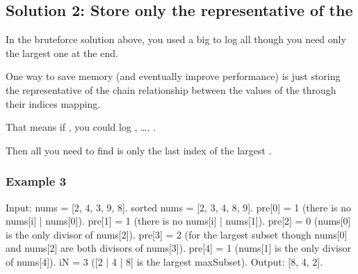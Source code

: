 \documentclass[letterpaper,12pt,english]{book}
\begin{document}
\subsection{Solution 2: Store only the representative of the }
\label{\detokenize{Dynamic_Programming/05_DP_368_Largest_Divisible_Subset:solution-2-store-only-the-representative-of-the-maxsubset}}
\sphinxAtStartPar
In the brute\sphinxhyphen{}force solution above, you used a big  to log all  though you need only the largest one at the end.

\sphinxAtStartPar
One way to save memory (and eventually improve performance) is just storing the representative of the chain relationship between the values  of the  through their indices mapping.

\sphinxAtStartPar
That means if \sphinxcode{\sphinxupquote{maxSubset{[}i{]} = {[}nums{[}i0{]} | nums{[}i1{]} | ... | nums{[}iN1{]}{]} | nums{[}iN{]}{]}}}, you could log , …,  .

\sphinxAtStartPar
Then all you need to find is only the last index  of the largest .


\subsubsection{Example 3}
\label{\detokenize{Dynamic_Programming/05_DP_368_Largest_Divisible_Subset:id1}}
\begin{sphinxVerbatim}[commandchars=\\\{\}]
Input: nums = [2, 4, 3, 9, 8].
sorted nums = [2, 3, 4, 8, 9]. 
pre[0] = \PYGZhy{}1 (there is no nums[i] | nums[0]).
pre[1] = \PYGZhy{}1 (there is no nums[i] | nums[1]).
pre[2] = 0 (nums[0] is the only divisor of nums[2]).
pre[3] = 2 (for the largest subset though nums[0] and nums[2] are both divisors of nums[3]). 
pre[4] = 1 (nums[1] is the only divisor of nums[4]).
iN = 3 ([2 | 4 | 8] is the largest maxSubset).
Output: [8, 4, 2].
\end{sphinxVerbatim}
\end{document}
